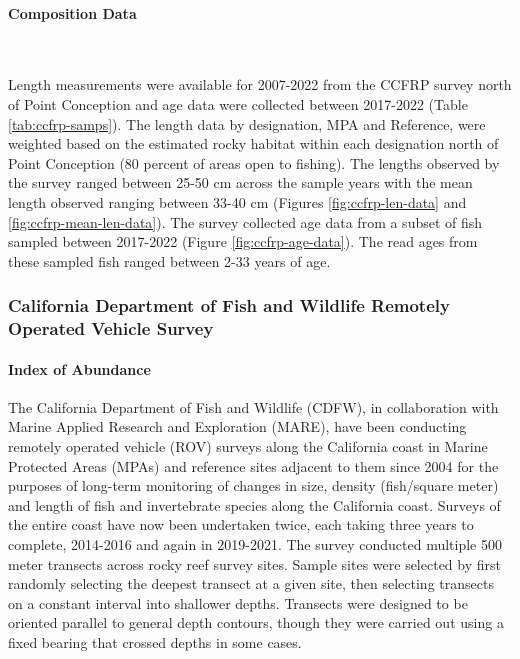 \documentclass[11pt,
  english,
  letterpaper,
]{article}
\begin{document}
\hypertarget{composition-data-2}{%
\paragraph{Composition Data}\label{composition-data-2}}

~

Length measurements were available for 2007-2022 from the CCFRP survey north of Point Conception and age data were collected between 2017-2022 (Table \ref{tab:ccfrp-samps}). The length data by designation, MPA and Reference, were weighted based on the estimated rocky habitat within each designation north of Point Conception (80 percent of areas open to fishing). The lengths observed by the survey ranged between 25-50 cm across the sample years with the mean length observed ranging between 33-40 cm (Figures \ref{fig:ccfrp-len-data} and \ref{fig:ccfrp-mean-len-data}). The survey collected age data from a subset of fish sampled between 2017-2022 (Figure \ref{fig:ccfrp-age-data}). The read ages from these sampled fish ranged between 2-33 years of age.

\hypertarget{california-department-of-fish-and-wildlife-remotely-operated-vehicle-survey}{%
\subsubsection{California Department of Fish and Wildlife Remotely Operated Vehicle Survey}\label{california-department-of-fish-and-wildlife-remotely-operated-vehicle-survey}}

\hypertarget{index-of-abundance-1}{%
\paragraph{Index of Abundance}\label{index-of-abundance-1}}

\hfill\break

The California Department of Fish and Wildlife (CDFW), in collaboration with Marine Applied Research and Exploration (MARE), have been conducting remotely operated vehicle (ROV) surveys along the California coast in Marine Protected Areas (MPAs) and reference sites adjacent to them since 2004 for the purposes of long-term monitoring of changes in size, density (fish/square meter) and length of fish and invertebrate species along the California coast. Surveys of the entire coast have now been undertaken twice, each taking three years to complete, 2014-2016 and again in 2019-2021. The survey conducted multiple 500 meter transects across rocky reef survey sites. Sample sites were selected by first randomly selecting the deepest transect at a given site, then selecting transects on a constant interval into shallower depths. Transects were designed to be oriented parallel to general depth contours, though they were carried out using a fixed bearing that crossed depths in some cases.
\end{document}
